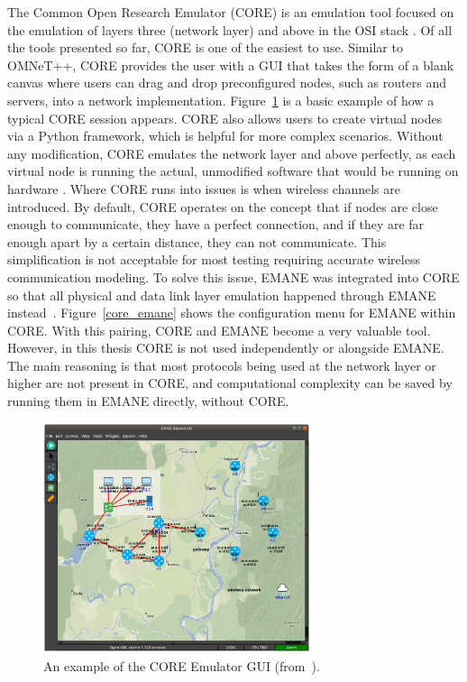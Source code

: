 The Common Open Research Emulator (CORE) is an emulation tool focused on the emulation of layers three (network layer) and above in the OSI stack \cite{core}.
Of all the tools presented so far, CORE is one of the easiest to use.
Similar to OMNeT++, CORE provides the user with a GUI that takes the form of a blank canvas where users can drag and drop preconfigured nodes, such as routers and servers, into a network implementation.
Figure~\ref{core_gui} is a basic example of how a typical CORE session appears.
CORE also allows users to create virtual nodes via a Python framework, which is helpful for more complex scenarios.
Without any modification, CORE emulates the network layer and above perfectly, as each virtual node is running the actual, unmodified software that would be running on hardware \cite{emane_core}.
Where CORE runs into issues is when wireless channels are introduced.
By default, CORE operates on the concept that if nodes are close enough to communicate, they have a perfect connection, and if they are far enough apart by a certain distance, they can not communicate.
This simplification is not acceptable for most testing requiring accurate wireless communication modeling. To solve this issue, EMANE was integrated into CORE so that all physical and data link layer emulation happened through EMANE instead~\cite{emane_core}.
Figure~\ref{core_emane} shows the configuration menu for EMANE within CORE.
With this pairing, CORE and EMANE become a very valuable tool.
However, in this thesis CORE is not used independently or alongside EMANE.
The main reasoning is that most protocols being used at the network layer or higher are not present in CORE, and computational complexity can be saved by running them in EMANE directly, without CORE.\par

\begin{figure}[!ht]
    \centering
    \includegraphics[width=0.7\textwidth,keepaspectratio]{Images/Chpt2/core_gui.png}
    \caption{An example of the CORE Emulator GUI (from~\cite{core}).}
    \label{core_gui}
\end{figure}

